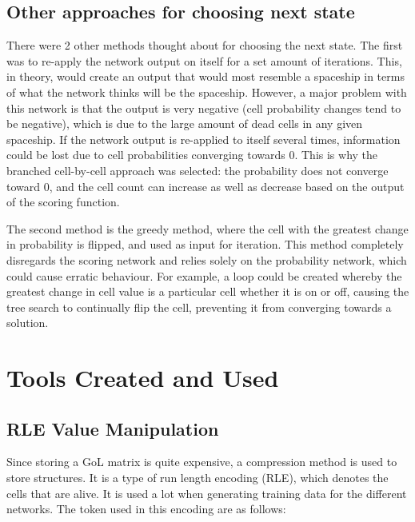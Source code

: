 \documentclass{l4proj}
\begin{document}
\subsection{Other approaches for choosing next state}

There were 2 other methods thought about for choosing the next state. The first was to re-apply the network output on itself for a set amount of iterations. This, in theory, would create an output that would most resemble a spaceship in terms of what the network thinks will be the spaceship. However, a major problem with this network is that the output is very negative (cell probability changes tend to be negative), which is due to the large amount of dead cells in any given spaceship. If the network output is re-applied to itself several times, information could be lost due to cell probabilities converging towards 0. This is why the branched cell-by-cell approach was selected: the probability does not converge toward 0, and the cell count can increase as well as decrease based on the output of the scoring function.

The second method is the greedy method, where the cell with the greatest change in probability is flipped, and used as input for iteration. This method completely disregards the scoring network and relies solely on the probability network, which could cause erratic behaviour. For example, a loop could be created whereby the greatest change in cell value is a particular cell whether it is on or off, causing the tree search to continually flip the cell, preventing it from converging towards a solution.


\section{Tools Created and Used}

\subsection{RLE Value Manipulation}

Since storing a GoL matrix is quite expensive, a compression method is used to store structures. It is a type of run length encoding (RLE), which denotes the cells that are alive. It is used a lot when generating training data for the different networks. The token used in this encoding are as follows:
\end{document}
